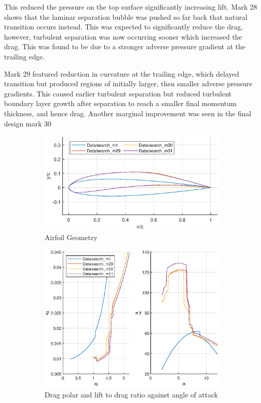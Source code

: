 \documentclass{article}
\begin{document}
This reduced the pressure on the top surface significantly increasing lift.
Mark 28 shows that the laminar separation bubble was pushed so far back that natural transition occurs instead.
This was expected to significantly reduce the drag, however, turbulent separation was now occurring sooner which increased the drag.
This was found to be due to a stronger adverse pressure gradient at the trailing edge.

Mark 29 featured reduction in curvature at the trailing edge, which delayed transition but produced regions of initially larger, then smaller adverse pressure gradients.
This caused earlier turbulent separation but reduced turbulent boundary layer growth after separation to reach a smaller final momentum thickness, and hence drag.
Another marginal improvement was seen in the final design mark 30 

\begin{figure}[H]
    \begin{subfigure}{0.54\textwidth}
        \centering
        \includegraphics[width=1.2\textwidth, center]{figures/loRe_geometry_31.eps}
        \caption{Airfoil Geometry}
        \label{fig:m31_geometry}
    \end{subfigure}
    \begin{subfigure}{0.45\textwidth}
        \centering
        \includegraphics[width=1.2\textwidth, center]{figures/loRe_lod_31.eps}
        \caption{Drag polar and lift to drag ratio against angle of attack}
        \label{fig:m31_lod}
    \end{subfigure}
    \caption{}
\end{figure}
\end{document}
